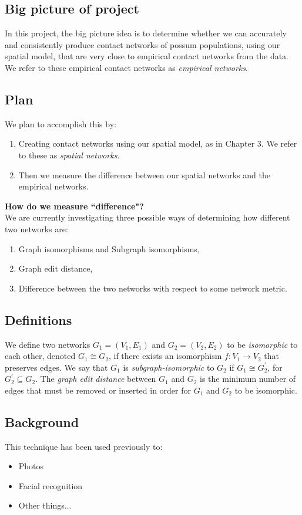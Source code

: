 \subsection{Big picture of project}
In this project, the big picture idea is to determine whether we can accurately and consistently produce contact networks of possum populations, using our spatial model, that are very close to empirical contact networks from the data. We refer to these empirical contact networks as \textit{empirical networks}.
\subsection{Plan}
We plan to accomplish this by:
\begin{enumerate}
    \item Creating contact networks using our spatial model, as in Chapter 3. We refer to these as \textit{spatial networks}.
    \item Then we measure the difference between our spatial networks and the empirical networks.
\end{enumerate}
\textbf{How do we measure ``difference"?}
\\ We are currently investigating three possible ways of determining how different two networks are:
\begin{enumerate}
    \item Graph isomorphisms and Subgraph isomorphisms,
    \item Graph edit distance,
    \item Difference between the two networks with respect to some network metric.
\end{enumerate}

\subsection{Definitions}
We define two networks $G_1 = (V_1,E_1)$ and $G_2 = (V_2,E_2)$ to be \textit{isomorphic} to each other, denoted $G_1 \cong G_2$, if there exists an isomorphism $f: V_1 \to V_2$ that preserves edges. We say that $G_1$ is \textit{subgraph-isomorphic} to $G_2$ if $G_1 \cong G^{'}_2$, for $G^{'}_2 \subseteq G_2$. The \textit{graph edit distance} between $G_1$ and $G_2$ is the minimum number of edges that must be removed or inserted in order for $G_1$ and $G_2$ to be isomorphic.





\subsection{Background}
This technique has been used previously to:
\begin{itemize}
    \item Photos
    \item Facial recognition
    \item Other things...
\end{itemize}



